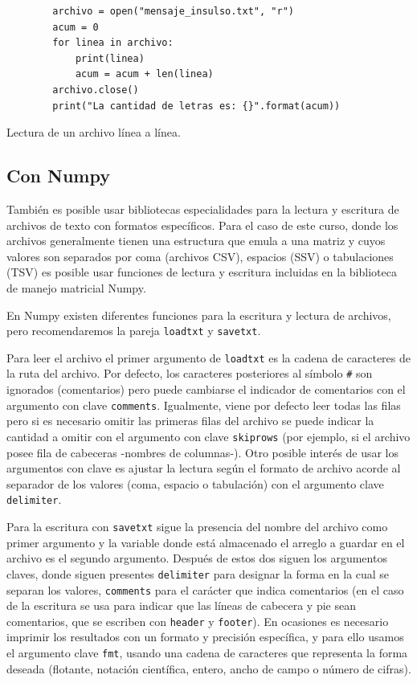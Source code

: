 \begin{listing}[H]
    \begin{verbatim}
        archivo = open("mensaje_insulso.txt", "r")
        acum = 0
        for linea in archivo:
            print(linea)
            acum = acum + len(linea)
        archivo.close()
        print("La cantidad de letras es: {}".format(acum))
    \end{verbatim}
    \caption{Lectura de un archivo línea a línea.}
    \label{lst:leer_python}
\end{listing}


\subsection{Con Numpy}

También es posible usar bibliotecas especialidades para la lectura y escritura
de archivos de texto con formatos específicos. Para el caso de este curso, donde
los archivos generalmente tienen una estructura que emula a una matriz y cuyos valores
son separados por coma (archivos CSV), espacios (SSV) o tabulaciones (TSV) es posible
usar funciones de lectura y escritura incluidas en la biblioteca de manejo matricial Numpy.

En Numpy existen diferentes funciones para la escritura y lectura de archivos, pero recomendaremos
la pareja \texttt{loadtxt} y \texttt{savetxt}.

Para leer el archivo el primer argumento de \texttt{loadtxt} es la cadena de caracteres de la ruta
del archivo. Por defecto, los caracteres posteriores al símbolo \texttt{\#} son ignorados (comentarios)
pero puede cambiarse el indicador de comentarios con el argumento con clave \texttt{comments}. Igualmente,
viene por defecto leer todas las filas pero si es necesario omitir las primeras filas del archivo se puede
indicar la cantidad a omitir con el argumento con clave \texttt{skiprows} (por ejemplo, si el archivo posee
fila de cabeceras -nombres de columnas-). Otro posible interés de usar los argumentos con clave es ajustar
la lectura según el formato de archivo acorde al separador de los valores (coma, espacio o tabulación) con el
argumento clave \texttt{delimiter}.

Para la escritura con \texttt{savetxt} sigue la presencia del nombre del archivo como primer argumento y 
la variable donde está almacenado el arreglo a guardar en el archivo es el segundo argumento. Después de estos
dos siguen los argumentos claves, donde siguen presentes \texttt{delimiter} para designar la forma en la cual se
separan los valores, \texttt{comments} para el carácter que indica comentarios (en el caso de la escritura se usa
para indicar que las líneas de cabecera y pie sean comentarios, que se escriben con \texttt{header} y \texttt{footer}).
En ocasiones es necesario imprimir los resultados con un formato y precisión específica, y para ello usamos el argumento
clave \texttt{fmt}, usando una cadena de caracteres que representa la forma deseada (flotante, notación científica, entero,
ancho de campo o número de cifras).


